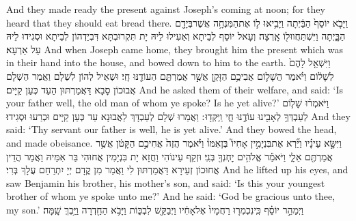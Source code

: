 {And they made ready the present against Joseph’s coming at noon; for they heard that they should eat bread there.}{}
{וַיָּבֹ֤א יוֹסֵף֙ הַבַּ֔יְתָה וַיָּבִ֥יאּוּ ל֛וֹ אֶת\maqqaf הַמִּנְחָ֥ה אֲשֶׁר\maqqaf בְּיָדָ֖ם הַבָּ֑יְתָה וַיִּשְׁתַּחֲווּ\maqqaf ל֖וֹ אָֽרְצָה׃}
{וְעָאל יוֹסֵף לְבֵיתָא וְאַעִילוּ לֵיהּ יָת תִּקְרוּבְתָּא דִּבְיַדְהוֹן לְבֵיתָא וּסְגִידוּ לֵיהּ עַל אַרְעָא׃}
{And when Joseph came home, they brought him the present which was in their hand into the house, and bowed down to him to the earth.}{}
{וַיִּשְׁאַ֤ל לָהֶם֙ לְשָׁל֔וֹם וַיֹּ֗אמֶר הֲשָׁל֛וֹם אֲבִיכֶ֥ם הַזָּקֵ֖ן אֲשֶׁ֣ר אֲמַרְתֶּ֑ם הַעוֹדֶ֖נּוּ חָֽי׃}
{וּשְׁאֵיל לְהוֹן לִשְׁלָם וַאֲמַר הַשְׁלָם אֲבוּכוֹן סָבָא דַּאֲמַרְתּוּן הַעַד כְּעַן קַיָּים׃}
{And he asked them of their welfare, and said: ‘Is your father well, the old man of whom ye spoke? Is he yet alive?’}{}
{וַיֹּאמְר֗וּ שָׁל֛וֹם לְעַבְדְּךָ֥ לְאָבִ֖ינוּ עוֹדֶ֣נּוּ חָ֑י וַֽיִּקְּד֖וּ ׃}
{וַאֲמַרוּ שְׁלָם לְעַבְדָּךְ לַאֲבוּנָא עַד כְּעַן קַיָּים וּכְרַעוּ וּסְגִידוּ׃}
{And they said: ‘Thy servant our father is well, he is yet alive.’ And they bowed the head, and made obeisance.}{}
{וַיִּשָּׂ֣א עֵינָ֗יו וַיַּ֞רְא אֶת\maqqaf בִּנְיָמִ֣ין אָחִיו֮ בֶּן\maqqaf אִמּוֹ֒ וַיֹּ֗אמֶר הֲזֶה֙ אֲחִיכֶ֣ם הַקָּטֹ֔ן אֲשֶׁ֥ר אֲמַרְתֶּ֖ם אֵלָ֑י וַיֹּאמַ֕ר אֱלֹהִ֥ים יׇחְנְךָ֖ בְּנִֽי׃}
{וּזְקַף עֵינוֹהִי וַחֲזָא יָת בִּנְיָמִין אֲחוּהִי בַּר אִמֵּיהּ וַאֲמַר הֲדֵין אֲחוּכוֹן זְעֵירָא דַּאֲמַרְתּוּן לִי וַאֲמַר מִן קֳדָם יְיָ יִתְרַחַם עֲלָךְ בְּרִי׃}
{And he lifted up his eyes, and saw Benjamin his brother, his mother’s son, and said: ‘Is this your youngest brother of whom ye spoke unto me?’ And he said: ‘God be gracious unto thee, my son.’}{}
{וַיְמַהֵ֣ר יוֹסֵ֗ף כִּֽי\maqqaf נִכְמְר֤וּ רַחֲמָיו֙ אֶל\maqqaf אָחִ֔יו וַיְבַקֵּ֖שׁ לִבְכּ֑וֹת וַיָּבֹ֥א הַחַ֖דְרָה וַיֵּ֥בְךְּ שָֽׁמָּה׃}
